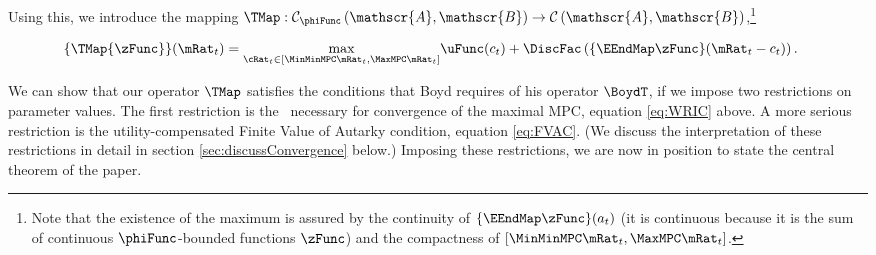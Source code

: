 \documentclass[BufferStockTheory]{subfiles}
\begin{document}
Using this, we introduce the mapping \textit{$\TMap:\mathcal{C}_{\phiFunc }\left( \mathscr{A},\mathscr{B}\right) \rightarrow \mathcal{C}\left(
    \mathscr{A},\mathscr{B}\right) $},\footnote{Note that the existence of the maximum is assured by the continuity of $\{\EEndMap \zFunc\}(a_{t})$ (it is continuous because it is the sum of continuous $\phiFunc$-bounded functions $\zFunc$) and the compactness of $[\MinMinMPC \mRat_{t},  \MaxMPC \mRat_{t}]$.}
\begin{comment} %
  (In the subtle case when $\MinMinMPC=0$, the compact interval could be revised as $ [(\MinMinMPC+\epsilon) \mRat_{t},
  \MaxMPC \mRat_{t}]$ where $\epsilon$ is a very small positive number because obviously $\MinMinMPC \mRat_{t}=0$ will not be the $\argmax$)
\end{comment}
\begin{align}
  \{\TMap{\zFunc}\}(\mRat_{t})  & = \underset{{\cRat}_{t} \in
                                  [\MinMinMPC \mRat_{t}, \MaxMPC \mRat_{t}]
                                  } \max
                                  \uFunc(c_{t})+\DiscFac \left( \{\EEndMap \zFunc \}(\mRat_{t}-c_{t}) \right)  \label{definitionmappingT}.
\end{align}


\begin{comment}
  Unpacking the definitions, our mapping $\TMap$ can be written more explicitly as
  \begin{align}
    \{\TMap\zFunc\}(\mRat_{t})  & = \underset{\cRat_{t} \in [\MinMinMPC
                                  \mRat_{t}, \MaxMPC \mRat_{t}]} \max \left\{
                                  \uFunc(c_{t})+\DiscFac \Ex_{t}\left[ {\PGro}_{t+1} ^{1-\CRRA }\zFunc(
                                  {\aRat}_{t}\Rnorm_{t+1}+\tShkAll_{t+1}) \right] \right\}
                                  .
  \end{align}
\end{comment}

\hypertarget{Contraction-Conditions}{}

We can show that our operator $\TMap$ satisfies the conditions that
Boyd requires of his operator $\BoydT$, if we impose two restrictions
on parameter values.  The first restriction is the \WRIC~necessary for
convergence of the maximal MPC, equation \eqref{eq:WRIC} above.  A
more serious restriction is the utility-compensated Finite Value of
Autarky condition, equation \eqref{eq:FVAC}.  (We discuss the
interpretation of these restrictions in detail in section
\ref{sec:discussConvergence} below.)  Imposing these restrictions, we
are now in position to state the central theorem of the paper.
\end{document}
